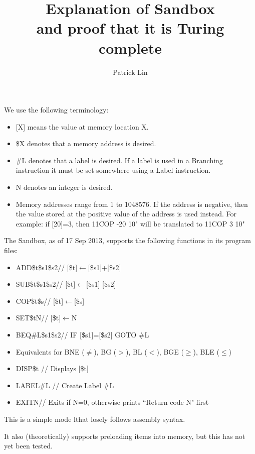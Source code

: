 \documentclass{article}
\title{Explanation of Sandbox\\\normalsize{and proof that it is Turing complete}}
\author{Patrick Lin}
\newcommand{\get}{$\gets$}
\begin{document}
\maketitle

We use the following terminology:

\begin{itemize}
\item {[X]} means the value at memory location X.
\item \$X denotes that a memory address is desired.
\item \#L denotes that a label is desired. If a label is used in a Branching instruction it must be set somewhere using a Label instruction.
\item N denotes an integer is desired.
\item Memory addresses range from 1 to 1048576. If the address is negative, then the value stored at the positive value of the address is used instead. For example: if [20]=3, then 11COP -20 10" will be translated to 11COP 3 10"
\end{itemize}

The Sandbox, as of 17 Sep 2013, supports the following functions in its program files:

\begin{itemize}
\item ADD\quad\$t\quad\$s1\quad\$s2\qquad// [\$t]\get[\$s1]+[\$s2]
\item SUB\quad\$t\quad\$s1\quad\$s2\qquad// [\$t]\get[\$s1]-[\$s2]
\item COP\quad\$t\quad\$s\qquad// [\$t]\get[\$s]
\item SET\quad\$t\quad N\qquad// [\$t]\get N
\item BEQ\quad\#L\quad\$s1\quad\$s2\qquad// IF [\$s1]=[\$s2] GOTO \#L
\item Equivalents for BNE ($\ne$), BG ($>$), BL ($<$), BGE ($\ge$), BLE ($\le$)
\item DISP\quad\$t \qquad// Displays [\$t]
\item LABEL\quad\#L \qquad// Create Label \#L
\item EXIT\quad N\qquad// Exits if N=0, otherwise prints ``Return code N" first
\end{itemize}

This is a simple mode lthat losely follows assembly syntax.

It also (theoretically) supports preloading items into memory, but this has not yet been tested.

\pagebreak
\end{document}
